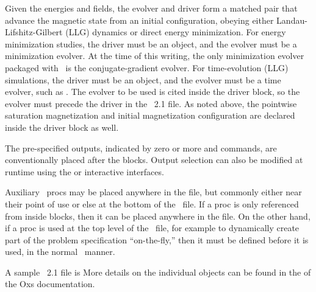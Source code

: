 Given the energies and fields, the evolver and driver form a matched
pair that advance the magnetic state from an initial configuration,
obeying either Landau-Lifshitz-Gilbert (LLG) dynamics or direct energy
minimization.  For energy minimization studies, the driver must be an
 object, and the evolver must be a minimization
evolver.  At the time of this writing, the only minimization evolver
packaged with \OOMMF\ is the  conjugate-gradient
evolver.  For time-evolution (LLG) simulations, the driver must be an
 object, and the evolver must be a time evolver,
such as .  The evolver to be used is cited
inside the driver  block, so the evolver must precede the
driver in the \MIF~2.1 file.  As noted above, the pointwise saturation
magnetization  and initial magnetization configuration 
are declared inside the driver  block as well.

The pre-specified outputs, indicated by zero or more
 and
 commands, are
conventionally placed after the  blocks.  Output selection
can also be modified at runtime using the
 or
 interactive interfaces.

Auxiliary \Tcl\ procs may be placed anywhere in the file, but
commonly either near their point of use or else at the bottom of the
\MIF\ file.  If a proc is only referenced from inside  blocks, then
it can be placed anywhere in the file.  On the other hand, if a proc is
used at the top level of the \MIF\ file, for example to dynamically
create part of the problem specification ``on-the-fly,'' then it must be
defined before it is used, in the normal \Tcl\ manner.

A sample \MIF~2.1 file is 
More details on the individual  objects can be found in the
of the Oxs documentation.


